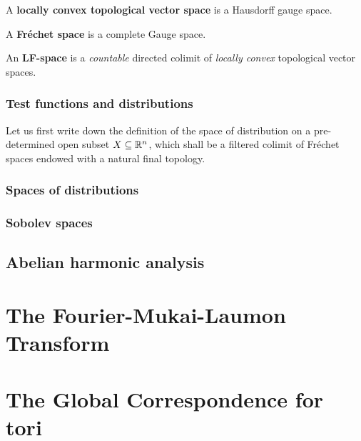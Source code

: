                 \begin{definition} \label{def: locally_convex_topological_vector_spaces}
                    A \textbf{locally convex topological vector space} is a Hausdorff gauge space. 
                \end{definition}
                
                \begin{definition} \label{def: frechet_spaces}
                    A \textbf{Fr\'echet space} is a complete Gauge space.
                \end{definition}
                
                \begin{definition}[LF-spaces] \label{def: LF_spaces}
                    An \textbf{LF-space} is a \textit{countable} directed colimit of \textit{locally convex} topological vector spaces.
                \end{definition}
                
            \subsubsection{Test functions and distributions}
                Let us first write down the definition of the space of distribution on a pre-determined open subset $X \subseteq \mathbb{R}^n$, which shall be a filtered colimit of Fr\'echet spaces endowed with a natural final topology.
                \begin{definition}[Distributions] \label{def: distributions}
                    
                \end{definition}
            
            \subsubsection{Spaces of distributions}
        
            \subsubsection{Sobolev spaces}
            
        \subsection{Abelian harmonic analysis}
    
    \section{The Fourier-Mukai-Laumon Transform}
    
    \section{The Global Correspondence for tori}